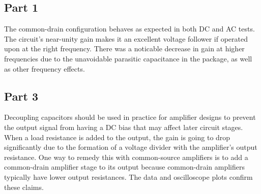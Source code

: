\subsection{Part 1}
The common-drain configuration behaves as expected in both DC and AC tests. The circuit's near-unity gain makes it an excellent voltage follower if operated upon at the right frequency.
There was a noticable decrease in gain at higher frequencies due to the unavoidable parasitic capacitance in the package, as well as other frequency effects.
\subsection{Part 3}
Decoupling capacitors should be used in practice for amplifier designs to prevent the output signal from having a DC bias that may affect later circuit stages.
When a load resistance is added to the output, the gain is going to drop significantly due to the formation of a voltage divider with the amplifier's output resistance.
One way to remedy this with common-source amplifiers is to add a common-drain amplifier stage to its output because common-drain amplifiers typically have lower output resistances.
The data and oscilloscope plots confirm these claims.
